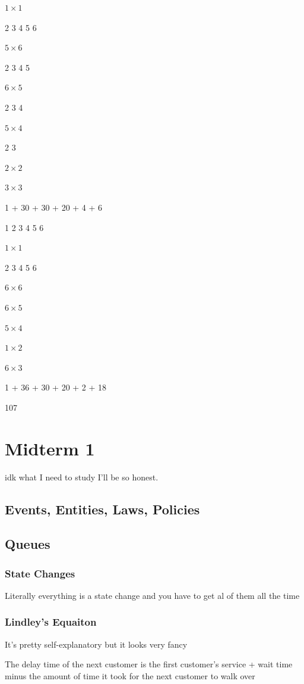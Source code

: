 \documentclass[fleqn]{report}
\begin{document}
$1 \times 1$

2 3 4 5 6 

$5 \times 6$

2 3 4 5

$6 \times 5$

2 3 4

$5 \times 4$

2 3

$2 \times 2$ 

$3 \times 3$

1 + 30 + 30 + 20 + 4 + 6

1 2 3 4 5 6

$1 \times 1$ 

2 3 4 5 6

$6 \times 6$ 
 
$6 \times 5$

$5 \times 4$

$1 \times 2$ 

$6 \times 3$

1 + 36 + 30 + 20 + 2 + 18

107


\chapter{Midterm 1}
idk what I need to study I'll be so honest. 

\section{Events, Entities, Laws, Policies}

\section{Queues}

\subsection{State Changes}
Literally everything is a state change and you have to get al of them all the time 

\subsection{Lindley's Equaiton}
It's pretty self-explanatory but it looks very fancy 

The delay time of the next customer is the first customer's service + wait time 
minus the amount of time it took for the next customer to walk over 
\end{document}
